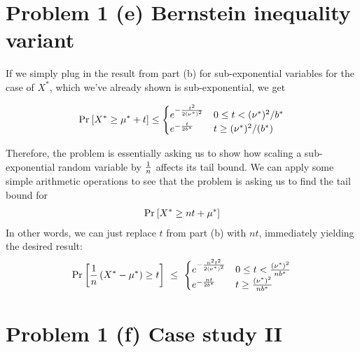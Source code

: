 \documentclass[11pt]{article}
\newcommand{\1}{\mathbb{I}} %
\begin{document}
\clearpage 
\section*{Problem 1 (e) Bernstein inequality variant}

If we simply plug in the result from part (b) for sub-exponential variables for the case of $X^*$, which we've already shown is sub-exponential, we get

\begin{align}
	\text{Pr}_{}\left[X^* \geq \mu^* + t\right] 
	\leq \begin{cases}
		e^{- \frac{t^2}{2 (\nu^*)^2}} & 0 \leq t < (\nu^*)^2 / b^* \\
		e^{-\frac{t}{2b^*}} & t \geq (\nu^*)^2 / (b^*)
	\end{cases}
\end{align}

Therefore, the problem is essentially asking us to show how scaling a sub-exponential random variable by $\frac{1}{n}$ affects its tail bound. We can apply some simple arithmetic operations to see that the problem is asking us to find the tail bound for
\begin{align}
	\text{Pr}_{}\left[  X^* \geq nt + \mu^*\right]
\end{align}
In other words, we can just replace $t$ from part (b) with $nt$, immediately yielding the desired result:
\begin{align}
\text{Pr}_{}\left[\frac{1}{n} \left( X^* - \mu^* \right) \geq t\right]
~\leq~ \begin{cases}
	e^{- \frac{n^2 t^2}{2(\nu^*)^2} } & 0 \leq t < \frac{(\nu^*)^2}{n b^*} \\
	e^{-\frac{nt}{2b^*}} & t \geq \frac{( \nu^* )^2}{  n b^* }
\end{cases}
\end{align}


\clearpage 
\section*{Problem 1 (f) Case study II}
\end{document}
